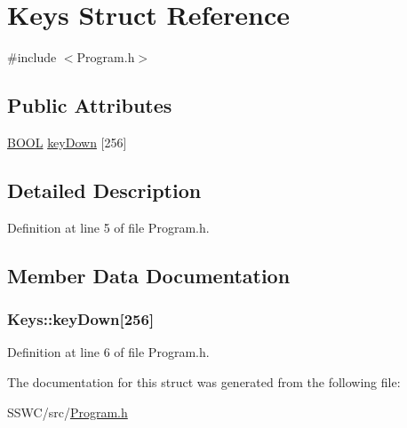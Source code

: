 \hypertarget{struct_keys}{\section{Keys Struct Reference}
\label{struct_keys}
}


{\ttfamily \#include $<$Program.\+h$>$}

\subsection*{Public Attributes}
\begin{DoxyCompactItemize}
\item 
\hyperlink{wglext_8h_a05538ca0e53ef21cb679e6de0fef7f8e}{B\+O\+O\+L} \hyperlink{struct_keys_af1256cce11c2121b4ed7145e6b9ff148}{key\+Down} \mbox{[}256\mbox{]}
\end{DoxyCompactItemize}


\subsection{Detailed Description}


Definition at line 5 of file Program.\+h.



\subsection{Member Data Documentation}
\hypertarget{struct_keys_af1256cce11c2121b4ed7145e6b9ff148}{
\subsubsection[{key\+Down}]{ Keys\+::key\+Down\mbox{[}256\mbox{]}}}\label{struct_keys_af1256cce11c2121b4ed7145e6b9ff148}


Definition at line 6 of file Program.\+h.



The documentation for this struct was generated from the following file\+:\begin{DoxyCompactItemize}
\item 
S\+S\+W\+C/src/\hyperlink{_program_8h}{Program.\+h}\end{DoxyCompactItemize}
